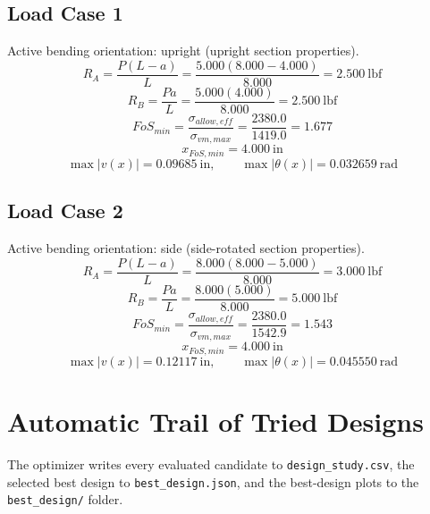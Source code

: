 \documentclass[11pt]{article}
\begin{document}
\subsection*{Load Case 1}
Active bending orientation: upright (upright section properties).
\[R_A = \frac{P(L-a)}{L} = \frac{5.000(8.000-4.000)}{8.000} = 2.500\ \mathrm{lbf}\]
\[R_B = \frac{Pa}{L} = \frac{5.000(4.000)}{8.000} = 2.500\ \mathrm{lbf}\]
\[FoS_{min} = \frac{\sigma_{allow,eff}}{\sigma_{vm,max}} = \frac{2380.0}{1419.0} = 1.677\]
\[x_{FoS,min} = 4.000\ \mathrm{in}\]
\[\max |v(x)| = 0.09685\ \mathrm{in}, \qquad \max |\theta(x)| = 0.032659\ \mathrm{rad}\]
\subsection*{Load Case 2}
Active bending orientation: side (side-rotated section properties).
\[R_A = \frac{P(L-a)}{L} = \frac{8.000(8.000-5.000)}{8.000} = 3.000\ \mathrm{lbf}\]
\[R_B = \frac{Pa}{L} = \frac{8.000(5.000)}{8.000} = 5.000\ \mathrm{lbf}\]
\[FoS_{min} = \frac{\sigma_{allow,eff}}{\sigma_{vm,max}} = \frac{2380.0}{1542.9} = 1.543\]
\[x_{FoS,min} = 4.000\ \mathrm{in}\]
\[\max |v(x)| = 0.12117\ \mathrm{in}, \qquad \max |\theta(x)| = 0.045550\ \mathrm{rad}\]

\section*{Automatic Trail of Tried Designs}
The optimizer writes every evaluated candidate to \texttt{design\_study.csv}, the selected best design to \texttt{best\_design.json}, and the best-design plots to the \texttt{best\_design/} folder.
\end{document}
